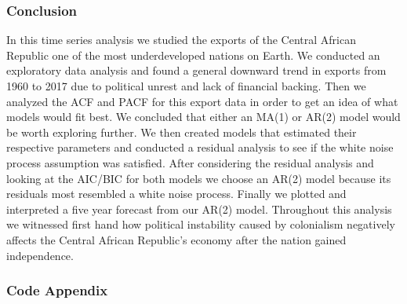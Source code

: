 \documentclass[
]{article}
\begin{document}
\hypertarget{conclusion}{%
\subsubsection{Conclusion}\label{conclusion}}

In this time series analysis we studied the exports of the Central
African Republic one of the most underdeveloped nations on Earth. We
conducted an exploratory data analysis and found a general downward
trend in exports from 1960 to 2017 due to political unrest and lack of
financial backing. Then we analyzed the ACF and PACF for this export
data in order to get an idea of what models would fit best. We concluded
that either an MA(1) or AR(2) model would be worth exploring further. We
then created models that estimated their respective parameters and
conducted a residual analysis to see if the white noise process
assumption was satisfied. After considering the residual analysis and
looking at the AIC/BIC for both models we choose an AR(2) model because
its residuals most resembled a white noise process. Finally we plotted
and interpreted a five year forecast from our AR(2) model. Throughout
this analysis we witnessed first hand how political instability caused
by colonialism negatively affects the Central African Republic's economy
after the nation gained independence.

\hypertarget{code-appendix}{%
\subsubsection{Code Appendix}\label{code-appendix}}
\end{document}
